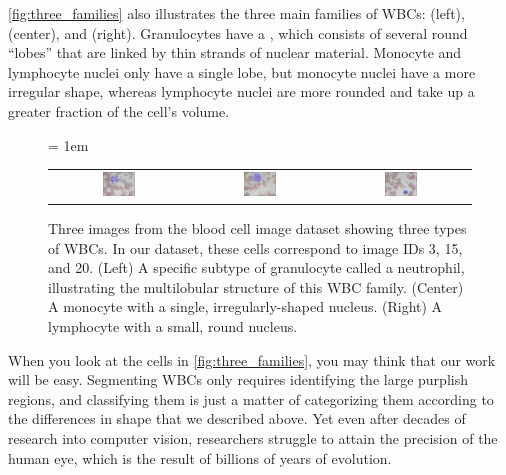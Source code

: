 \autoref{fig:three_families} also illustrates the three main families of WBCs:  (left),  (center), and  (right).  Granulocytes have a , which consists of several round ``lobes'' that are linked by thin strands of nuclear material. Monocyte and lymphocyte nuclei only have a single lobe, but monocyte nuclei have a more irregular shape, whereas lymphocyte nuclei are more rounded and take up a greater fraction of the cell's volume.\\

\begin{figure}[h]
\centering
\tabcolsep = 1em
\mySfFamily
\begin{tabular}{c c c}
\includegraphics[width = 0.25\textwidth]{../images/neutrophil.png} & \includegraphics[width = 0.25\textwidth]{../images/monocyte.png} & \includegraphics[width = 0.25\textwidth]{../images/lymphocyte.png}
\end{tabular}
\caption{Three images from the blood cell image dataset showing three types of WBCs. In our dataset, these cells correspond to image IDs 3, 15, and 20. (Left) A specific subtype of granulocyte called a neutrophil, illustrating the multilobular structure of this WBC family. (Center) A monocyte with a single, irregularly-shaped nucleus. (Right) A lymphocyte with a small, round nucleus.}
\label{fig:three_families}
\end{figure}

When you look at the cells in \autoref{fig:three_families}, you may think that our work will be easy. Segmenting WBCs only requires identifying the large purplish regions, and classifying them is just a matter of categorizing them according to the differences in shape that we described above. Yet even after decades of research into computer vision, researchers struggle to attain the precision of the human eye, which is the result of billions of years of evolution.\\

